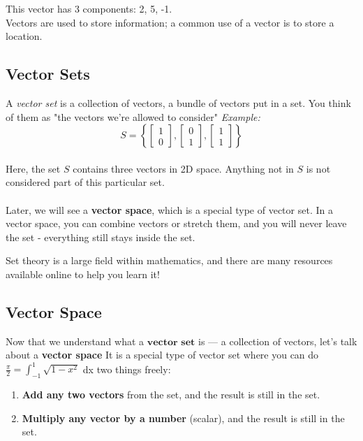 \documentclass[12pt]{report}
\begin{document}
        This vector has 3 components: 2, 5, -1. \\
        Vectors are used to store information; a common use of a vector is to store a location.

        \subsection{Vector Sets}
            A \emph{vector set} is a collection of vectors, a bundle of vectors put in a set. You think of them as "the vectors we're allowed to consider"
            \emph{Example:} 
            \begin{equation}
                S = \left\{ 
                    \begin{bmatrix}1\\0\end{bmatrix}, 
                    \begin{bmatrix}0\\1\end{bmatrix}, 
                    \begin{bmatrix}1\\1\end{bmatrix} 
                    \right\}
            \end{equation}
            \\
            Here, the set $S$ contains three vectors in 2D space. Anything not in $S$ is not considered part of this particular set. 
            \\\\
            Later, we will see a \textbf{vector space}, which is a special type of vector set. In a vector space, you can combine vectors or stretch them, and you will never leave the set - everything still stays inside the set.

            Set theory is a large field within mathematics, and there are many resources available online to help you learn it!

        \subsection{Vector Space}
            Now that we understand what a $\textbf{vector set}$ is — a collection of vectors, let's talk about a \textbf{vector space} It is a special type of vector set where you can do $\frac{\pi}{2} = \int_{-1}^{1} \sqrt{1-x^2}$ dx two things freely:

            \begin{enumerate}
                \item \textbf{Add any two vectors} from the set, and the result is still in the set.
                \item \textbf{Multiply any vector by a number} (scalar), and the result is still in the set.
            \end{enumerate}
\end{document}
